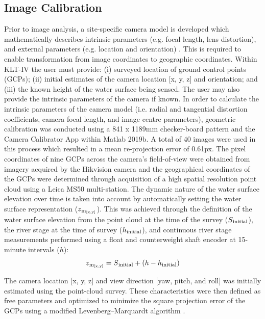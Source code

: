 \documentclass[hess, manuscript]{copernicus} %
\begin{document}
\subsection{Image Calibration}\label{Image Calibration}
Prior to image analysis, a site-specific camera model is developed which mathematically describes intrinsic parameters (e.g. focal length, lens distortion), and external parameters (e.g. location and orientation) \citep{Messerli2015, Perks2016}. This is required to enable transformation from image coordinates to geographic coordinates. Within KLT-IV the user must provide: (i) surveyed location of ground control points (GCPs); (ii) initial estimates of the camera location [x, y, z] and orientation; and (iii) the known height of the water surface being sensed. The user may also provide the intrinsic parameters of the camera if known. In order to calculate the intrinsic parameters of the camera model (i.e. radial and tangential distortion coefficients, camera focal length, and image centre parameters), geometric calibration was conducted using a 841 x 1189mm checker-board pattern and the Camera Calibrator App within Matlab 2019b. A total of 40 images were used in this process which resulted in a mean re-projection error of 0.61px. The pixel coordinates of nine GCPs across the camera's field-of-view were obtained from imagery acquired by the Hikvision camera and the geographical coordinates of the GCPs were determined through acquisition of a high spatial resolution point cloud using a Leica MS50 multi-station. The dynamic nature of the water surface elevation over time is taken into account by automatically setting the water surface representation ($z\textsubscript{m\textsubscript{[x,y]}}$). This was achieved through the definition of the water surface elevation from the point cloud at the time of the survey ($S\textsubscript{initial}$), the river stage at the time of survey ($h\textsubscript{initial}$), and continuous river stage measurements performed using a float and counterweight shaft encoder at 15-minute intervals ($h$):
\begin{equation}
 z\textsubscript{m\textsubscript{[x,y]}} = S\textsubscript{initial} + (h - h\textsubscript{initial})
\label{eqn: Equation 1}
\end{equation}

The camera location [x, y, z] and view direction [yaw, pitch, and roll] was initially estimated using the point-cloud survey. These characteristics were then defined as free parameters and optimized to minimize the square projection error of the GCPs using a modified Levenberg–Marquardt algorithm \citep{Fletcher1971, Messerli2015}.
\end{document}

